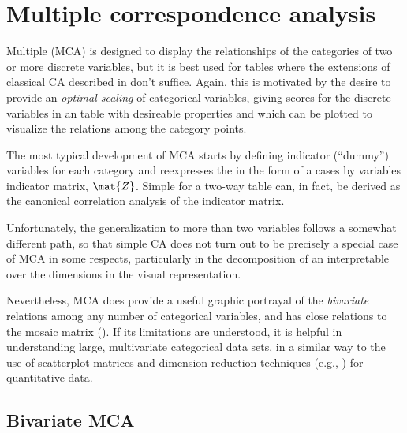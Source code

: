 \documentclass[11pt]{book}\usepackage[]{graphicx}\usepackage[]{color}
\begin{document}
\section{Multiple correspondence analysis}\label{sec:mca}

Multiple \ca (MCA) is designed to display the relationships of the categories
of two or more discrete variables, but it is best used for \mway tables
where the extensions of classical CA described in 
don't suffice.
Again, this is motivated by the desire to provide 
an \emph{optimal scaling} of categorical variables, giving scores for the 
discrete variables in an \nway table with desireable properties and which
can be plotted to visualize the relations among the category points.

The most typical development of MCA
starts by defining indicator (``dummy'') variables
for each category and reexpresses the \nway \ctab in the form
of a cases by variables indicator matrix, $\mat{Z}$.
Simple \ca for a two-way table can, in fact, be derived as the
canonical correlation analysis of the indicator matrix.

Unfortunately, the generalization to more than two variables follows
a somewhat different path, so that simple CA does not turn out to be
precisely a special case of MCA in some respects, particularly in the
decomposition of an interpretable \chisq over the dimensions in
the visual representation.

Nevertheless, MCA does provide a useful graphic portrayal of the
\emph{bivariate} relations among any number of categorical variables,
and has close relations to the mosaic matrix ().
If its limitations are understood, it is helpful in
understanding large, multivariate categorical data sets,
in a similar way to the use of scatterplot matrices
and dimension-reduction techniques 
(e.g., ) for quantitative data.



\subsection{Bivariate MCA}\label{sec:mca-bi}
\end{document}
